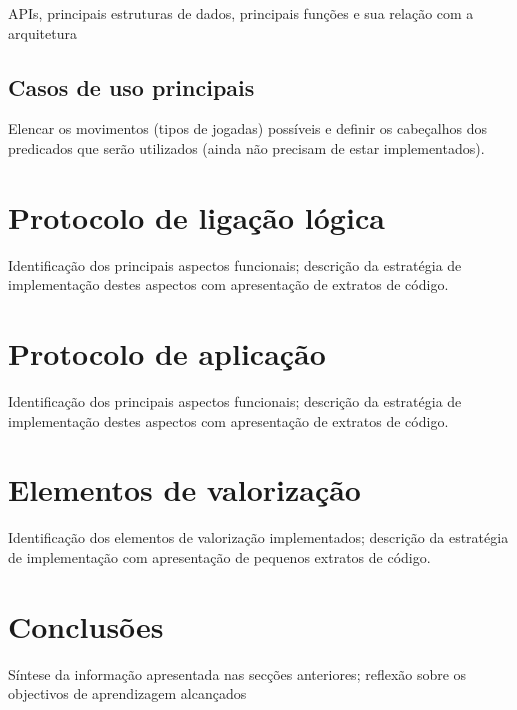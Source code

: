 \documentclass[a4paper]{article}
\begin{document}
APIs, principais estruturas de dados, principais funções e sua relação com a arquitetura

\subsection{Casos de uso principais}

Elencar os movimentos (tipos de jogadas) possíveis e definir os cabeçalhos dos predicados que serão utilizados (ainda não precisam de estar implementados).

\section{Protocolo de ligação lógica}

Identificação dos principais aspectos funcionais; descrição da estratégia de implementação destes aspectos com apresentação de extratos de código.

\section{Protocolo de aplicação}

Identificação dos principais aspectos funcionais; descrição da estratégia de implementação destes aspectos com apresentação de extratos de código.

\section{Elementos de valorização}

Identificação dos elementos de valorização implementados; descrição da estratégia de implementação com apresentação de pequenos extratos de código.

\section{Conclusões}

Síntese da informação apresentada nas secções anteriores; reflexão sobre os objectivos de aprendizagem alcançados
\end{document}
